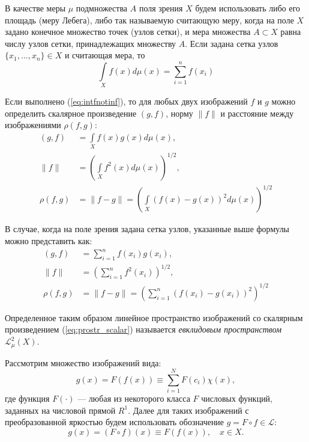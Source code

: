 В качестве меры $\mu$ подмножества $A$ поля зрения $X$ будем использовать либо его
площадь (меру Лебега), либо так называемую считающую меру, когда на поле $X$ задано конечное множество точек (узлов сетки), и мера множества $A \subset X$ равна числу узлов сетки, принадлежащих множеству $A$. Если задана сетка узлов $\{x_1, \dots ,x_n\} \in X$ и считающая мера, то
\begin{equation*}
    \int\limits_Xf(x)d\mu(x) =  \sum\limits_{i=1}^n f(x_i)
\end{equation*}


\begin{samepage}

Если выполнено (\ref{eq:intfnotinf}), то для любых двух изображений $f$ и $g$ можно определить скалярное произведение $(g, f)$, норму $\|f\|$ и расстояние между изображениями $\rho(f, g)$:
\begin{subequations}
\begin{align}
    (g, f)     & = \int\limits_X f(x)g(x)d\mu(x),\label{eq:prostr_scalar} \\
    \|f\|      & = \left(\int\limits_X f^2(x)d\mu(x)\right)^{1/2},\label{eq:prostr_norm} \\
    \rho(f, g) & = \|f - g\| = \left(\int\limits_X (f(x) - g(x))^2d\mu(x)\right)^{1/2}\label{eq:prostr_distance}
\end{align}
\end{subequations}

\end{samepage}


В случае, когда на поле зрения задана сетка узлов, указанные выше формулы можно представить как:
\begin{subequations}
\begin{align*}
    (g, f)     & =  \sum\limits_{i=1}^n f(x_i)g(x_i), \\
    \|f\|      & = \left(\sum\limits_{i=1}^n  f^2(x_i)\right)^{1/2}, \\
    \rho(f, g) & = \|f - g\| = \left(\sum\limits_{i=1}^n (f(x_i) - g(x_i))^2\right)^{1/2}
\end{align*}
\end{subequations}


Определенное таким образом линейное пространство изображений со скалярным произведением (\ref{eq:prostr_scalar}) называется \emph{евклидовым пространством} $\mathcal{L}_{\mu}^2(X)$.


Рассмотрим множество изображений вида:
\begin{equation*}
    g(x) = F(f(x)) \equiv  \sum\limits_{i=1}^{N}F(c_i)\chi(x),
\end{equation*}
где функция $F(\cdot)$ --- любая из некоторого класса $F$ числовых функций, заданных на числовой прямой $R^1$. Далее для таких изображений с преобразованной яркостью будем использовать обозначение $g = F \circ f \in \mathcal{L}$:
\begin{equation*}
g(x) = (F \circ f)(x) \equiv F(f(x)), \quad x \in X.
\end{equation*}

